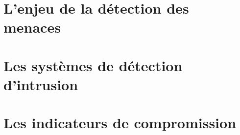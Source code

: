 
\section{L’enjeu de la détection des menaces}
\label{chap2:section1}
{\fontsize{14pt}{16pt}\selectfont
    
}

\newpage

\section{Les systèmes de détection d’intrusion}
\label{chap2:section2}
{\fontsize{14pt}{16pt}\selectfont
    
}

\newpage

\section{Les indicateurs de compromission}
\label{chap2:section3}
{\fontsize{14pt}{16pt}\selectfont
    
}






